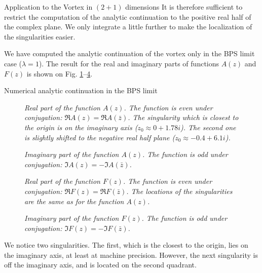 \begin{section}{Application to the Vortex in $(2+1)$ dimensions}
  It is therefore sufficient to restrict the computation of the
  analytic continuation to the positive real half of the complex
  plane. We only integrate a little further to make the localization
  of the singularities easier.

  We have computed the analytic continuation of the vortex only in
  the BPS limit case ($\lambda = 1$). The result for the real and
  imaginary parts of functions $A(z)$ and $F(z)$ is shown on
  Fig. \ref{fig:cm_vortex_a_real}--\ref{fig:cm_vortex_f_imag}.
  \begin{subsection}{Numerical analytic continuation in the BPS limit}
    \begin{figure}[!ht]
      \begin{center}
        
        \caption{\em Real part of the function $A(z)$. The function is
          even under conjugation: $\Re A(z) = \Re A(\bar z)$. The
          singularity which is closest to the origin is on the
          imaginary axis ($z_0 \approx 0+1.78i$). The second one is
          slightly shifted to the negative real half plane
          ($z_0\approx -0.4+6.1i$). }
        \label{fig:cm_vortex_a_real}
      \end{center}
    \end{figure}

    \begin{figure}[!ht]
      \begin{center}
        
        \caption{\em Imaginary part of the function $A(z)$. The function is
          odd under conjugation: $\Im A(z) = -\Im A(\bar z)$.}
        \label{fig:cm_vortex_a_imag}
      \end{center}
    \end{figure}

    \begin{figure}[!ht]
      \begin{center}
        
        \caption{\em Real part of the function $F(z)$. The function is
          even under conjugation: $\Re F(z) = \Re F(\bar z)$. The
          locations of the singularities are the same as for the
          function $A(z)$.}
        \label{fig:cm_vortex_f_real}
      \end{center}
    \end{figure}

    \begin{figure}[!ht]
      \begin{center}
        
        \caption{\em Imaginary part of the function $F(z)$. The function is
          odd under conjugation: $\Im F(z) = -\Im F(\bar z)$.}
        \label{fig:cm_vortex_f_imag}
      \end{center}
    \end{figure}
    We notice two singularities. The first, which is the closest to
    the origin, lies on the imaginary axis, at least at machine
    precision. However, the next singularity is off the imaginary
    axis, and is located on the second quadrant.
    

\end{subsection}
\end{section}
